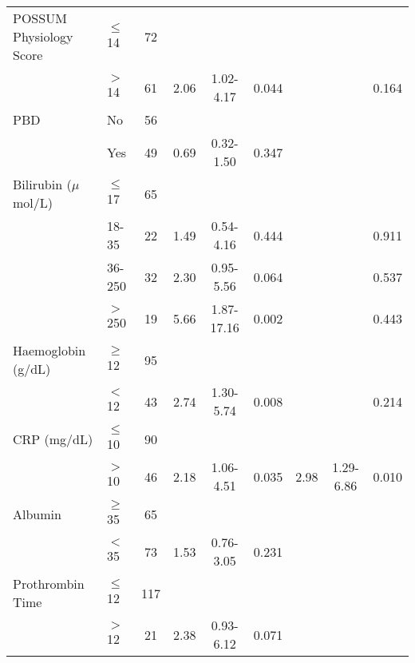 \begin{sidewaystable}[p]
\begin{tabular}{l l c c c c c c c}
		POSSUM Physiology Score & $\leq$ 14 & 72     &      &            &         &      &            &  \\
		                        & $>$ 14    & 61     & 2.06 & 1.02-4.17  & 0.044   &      &            & 0.164   \\
		PBD                     & No        & 56     &      &            &         &      &            &  \\
		                        & Yes       & 49     & 0.69 & 0.32-1.50  & 0.347   &      &            &  \\
		Bilirubin ($\mu$mol/L)    & $\leq$ 17 & 65     &      &            &         &      &            &  \\
		                        & 18-35     & 22     & 1.49 & 0.54-4.16  & 0.444   &      &            & 0.911   \\
		                        & 36-250    & 32     & 2.30 & 0.95-5.56  & 0.064   &      &            & 0.537   \\
		                        & $>$ 250   & 19     & 5.66 & 1.87-17.16 & 0.002   &      &            & 0.443   \\
		Haemoglobin (g/dL)      & $\geq$ 12 & 95     &      &            &         &      &            &  \\
		                        & $<$ 12    & 43     & 2.74 & 1.30-5.74  & 0.008   &      &            & 0.214   \\
		CRP (mg/dL)             & $\leq$ 10 & 90     &      &            &         &      &            &  \\
		                        & $>$ 10    & 46     & 2.18 & 1.06-4.51  & 0.035   & 2.98 & 1.29-6.86  & 0.010   \\
		Albumin                 & $\geq$ 35 & 65     &      &            &         &      &            &  \\
		                        & $<$ 35    & 73     & 1.53 & 0.76-3.05  & 0.231   &      &            &  \\
		Prothrombin Time        & $\leq$ 12 & 117    &      &            &         &      &            &  \\
		                        & $>$ 12    & 21     & 2.38 & 0.93-6.12  & 0.071   &      &            &
	\end{tabular}
\end{sidewaystable}